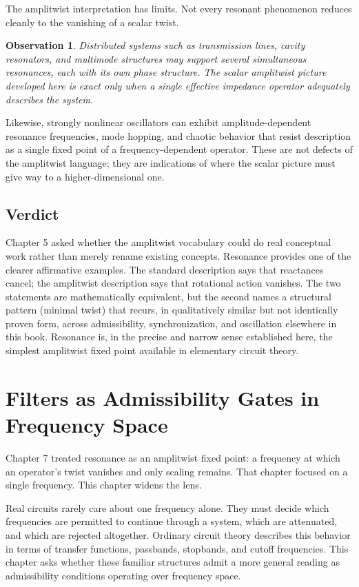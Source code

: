 \documentclass[12pt]{article}
\newtheorem{observation}{Observation}
\begin{document}
The amplitwist interpretation has limits. Not every resonant phenomenon reduces cleanly to the vanishing of a scalar twist.

\begin{observation}
Distributed systems such as transmission lines, cavity resonators, and multimode structures may support several simultaneous resonances, each with its own phase structure. The scalar amplitwist picture developed here is exact only when a single effective impedance operator adequately describes the system.
\end{observation}

Likewise, strongly nonlinear oscillators can exhibit amplitude-dependent resonance frequencies, mode hopping, and chaotic behavior that resist description as a single fixed point of a frequency-dependent operator. These are not defects of the amplitwist language; they are indications of where the scalar picture must give way to a higher-dimensional one.

\subsection{Verdict}

Chapter 5 asked whether the amplitwist vocabulary could do real conceptual work rather than merely rename existing concepts. Resonance provides one of the clearer affirmative examples. The standard description says that reactances cancel; the amplitwist description says that rotational action vanishes. The two statements are mathematically equivalent, but the second names a structural pattern (minimal twist) that recurs, in qualitatively similar but not identically proven form, across admissibility, synchronization, and oscillation elsewhere in this book. Resonance is, in the precise and narrow sense established here, the simplest amplitwist fixed point available in elementary circuit theory.

\section{Filters as Admissibility Gates in Frequency Space}

Chapter 7 treated resonance as an amplitwist fixed point: a frequency at which an operator's twist vanishes and only scaling remains. That chapter focused on a single frequency. This chapter widens the lens.

Real circuits rarely care about one frequency alone. They must decide which frequencies are permitted to continue through a system, which are attenuated, and which are rejected altogether. Ordinary circuit theory describes this behavior in terms of transfer functions, passbands, stopbands, and cutoff frequencies. This chapter asks whether these familiar structures admit a more general reading as admissibility conditions operating over frequency space.
\end{document}
